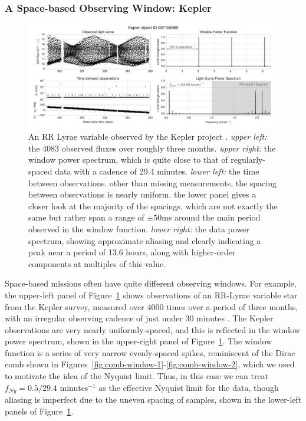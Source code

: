 \documentclass[preprint]{aastex}
\newcommand{\fig}[1]{Figure~\ref{fig:#1}}
\newcommand{\figs}[2]{Figures~\ref{fig:#1}-\ref{fig:#2}}
\newcommand{\figlabel}[1]{\label{fig:#1}}
\begin{document}
\subsubsection{A Space-based Observing Window: Kepler}

\begin{figure}[ht]
  \centering
  \includegraphics[width=\textwidth]{fig16_kepler_data}
  \caption{An RR Lyrae variable observed by the Kepler project \citep[see][]{Kolenberg2010}.
    {\it upper left:} the 4083 observed fluxes over roughly three months.
    {\it upper right:} the window power spectrum, which is quite close to that of regularly-spaced data with a cadence of 29.4 minutes.
    {\it lower left:} the time between observations. other than missing measurements, the spacing between observations is nearly uniform. the lower panel gives a closer look at the majority of the spacings, which are not exactly the same but rather span a range of $\pm 50$ms around the main period observed in the window function.
    {\it lower right:} the data power spectrum, showing approximate aliasing and clearly indicating a peak near a period of 13.6 hours, along with higher-order components at multiples of this value.
    \figlabel{kepler-data}}
\end{figure}

Space-based missions often have quite different observing windows.
For example, the upper-left panel of \fig{kepler-data}
shows observations of an RR-Lyrae variable star from the Kepler survey,
measured over 4000 times over a period of three months,
with an irregular observing cadence of just under 30 minutes
 \citep[For deeper discussion of these observations, see][]{Kolenberg2010}.
The Kepler observations are very nearly uniformly-spaced, and this is reflected
in the window power spectrum, shown in the upper-right panel of
\fig{kepler-data}.
The window function is a series of very narrow evenly-spaced spikes,
reminiscent of the Dirac comb shown in \figs{comb-window-1}{comb-window-2},
which we used to motivate the idea of the Nyquist limit.
Thus, in this case we can treat $f_{Ny} = 0.5/29.4$ minutes$^{-1}$ as the
effective Nyquist limit for the data, though aliasing is imperfect due to
the uneven spacing of samples, shown in the lower-left panels of
\fig{kepler-data}.
\end{document}
